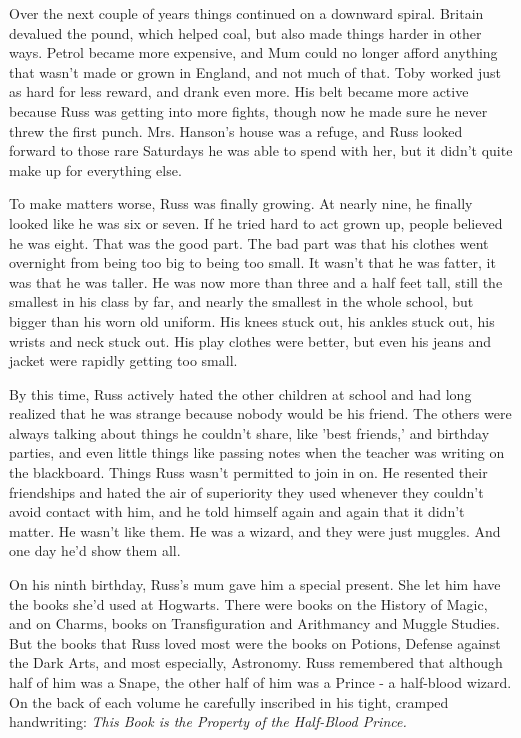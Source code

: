 \documentclass[a4paper,11pt]{article}
\begin{document}
Over the next couple of years things continued on a downward spiral. Britain devalued the pound, which helped coal, but also made things harder in other ways. Petrol became more expensive, and Mum could no longer afford anything that wasn't made or grown in England, and not much of that. Toby worked just as hard for less reward, and drank even more. His belt became more active because Russ was getting into more fights, though now he made sure he never threw the first punch. Mrs. Hanson's house was a refuge, and Russ looked forward to those rare Saturdays he was able to spend with her, but it didn't quite make up for everything else.

To make matters worse, Russ was finally growing. At nearly nine, he finally looked like he was six or seven. If he tried hard to act grown up, people believed he was eight. That was the good part. The bad part was that his clothes went overnight from being too big to being too small. It wasn't that he was fatter, it was that he was taller. He was now more than three and a half feet tall, still the smallest in his class by far, and nearly the smallest in the whole school, but bigger than his worn old uniform. His knees stuck out, his ankles stuck out, his wrists and neck stuck out. His play clothes were better, but even his jeans and jacket were rapidly getting too small.

By this time, Russ actively hated the other children at school and had long realized that he was strange because nobody would be his friend. The others were always talking about things he couldn't share, like 'best friends,' and birthday parties, and even little things like passing notes when the teacher was writing on the blackboard. Things Russ wasn't permitted to join in on. He resented their friendships and hated the air of superiority they used whenever they couldn't avoid contact with him, and he told himself again and again that it didn't matter. He wasn't like them. He was a wizard, and they were just muggles. And one day he'd show them all.

On his ninth birthday, Russ's mum gave him a special present. She let him have the books she'd used at Hogwarts. There were books on the History of Magic, and on Charms, books on Transfiguration and Arithmancy and Muggle Studies. But the books that Russ loved most were the books on Potions, Defense against the Dark Arts, and most especially, Astronomy. Russ remembered that although half of him was a Snape, the other half of him was a Prince - a half-blood wizard. On the back of each volume he carefully inscribed in his tight, cramped handwriting: \emph{This Book is the Property of the Half-Blood Prince.}
\end{document}
